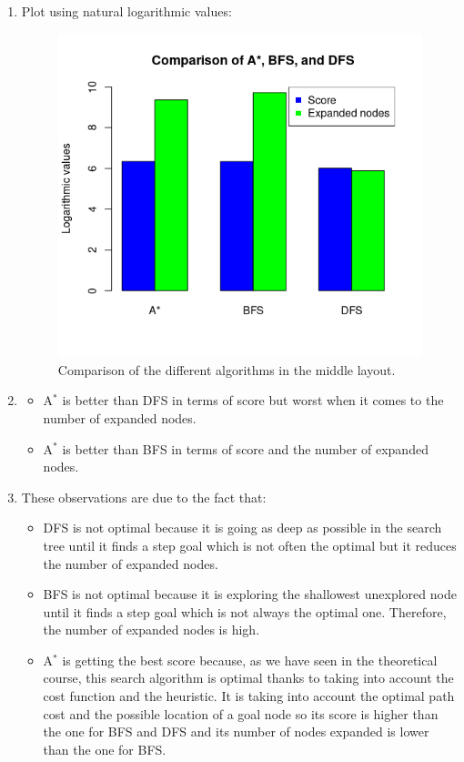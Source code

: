 \documentclass{article}
\begin{document}
\begin{enumerate}[label=\alph*.,leftmargin=1.35em]
    \item Plot using natural logarithmic values:\\
    \begin{figure}[H]
        \centering
        \includegraphics[scale=0.7]{q4_plot.png} 
        \caption{Comparison of the different algorithms in the middle layout.}
    \end{figure}
    \item
        \begin{itemize}
            \item A$^*$ is better than DFS in terms of score but worst when it comes to the number of expanded nodes.
            \item A$^*$ is better than BFS in terms of score and the number of expanded nodes.
        \end{itemize}
    \item These observations are due to the fact that:
        \begin{itemize}
            \item DFS is not optimal because it is going as deep as possible in the search tree until it finds a step goal which is not often the optimal but it reduces the number of expanded nodes.
            \item BFS is not optimal because it is exploring the shallowest unexplored node until it finds a step goal which is not always the optimal one. Therefore, the number of expanded nodes is high.
            \item A$^*$ is getting the best score because, as we have seen in the theoretical course, this search algorithm is optimal thanks to taking into account the cost function and the heuristic. It is taking into account the optimal path cost and the possible location of a goal node so its score is higher than the one for BFS and DFS and its number of nodes expanded is lower than the one for BFS.
        \end{itemize}
\end{enumerate}


\end{document}
